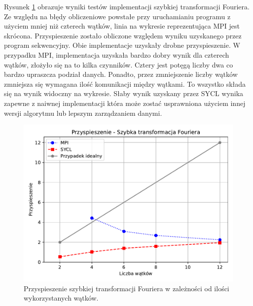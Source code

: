 \documentclass[a4paper,12pt]{book} %
\begin{document}
Rysunek \ref{fig:fft-speedup} obrazuje wyniki testów implementacji szybkiej transformacji Fouriera. Ze względu na błędy obliczeniowe powstałe przy uruchamianiu programu z użyciem mniej niż czterech wątków, linia na wykresie reprezentująca MPI jest skrócona. Przyspieszenie zostało obliczone względem wyniku uzyskanego przez program sekwencyjny. Obie implementacje uzyskały drobne przyspieszenie. W przypadku MPI, implementacja uzyskała bardzo dobry wynik dla czterech wątków, złożyło się na to kilka czynników. Cztery jest potęgą liczby dwa co bardzo upraszcza podział danych. Ponadto, przez zmniejszenie liczby wątków zmniejsza się wymagana ilość komunikacji między wątkami. To wszystko składa się na wynik widoczny na wykresie. Słaby wynik uzyskany przez SYCL wynika zapewne z naiwnej implementacji która może zostać usprawniona użyciem innej wersji algorytmu lub lepszym zarządzaniem danymi.

\begin{figure}
	\centering
	\includegraphics[scale=1]{assets/przyspieszenie_fft.pdf}
	\caption{Przyspieszenie szybkiej transformacji Fouriera w zależności od ilości wykorzystanych wątków.}
	\label{fig:fft-speedup}
\end{figure}
\end{document}
